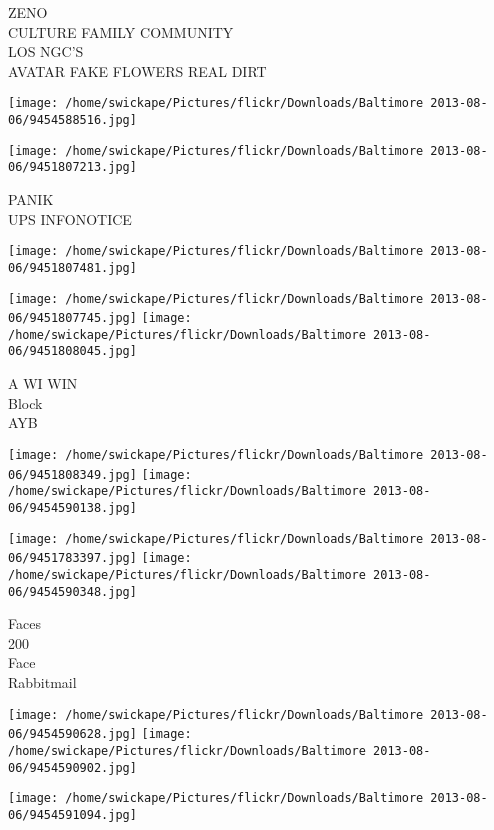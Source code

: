 \documentclass[10pt,letterpaper]{article}
\begin{document}
ZENO\\
CULTURE FAMILY COMMUNITY\\
LOS NGC'S\\
AVATAR FAKE FLOWERS REAL DIRT\\
\pagebreak

\texttt{[image: /home/swickape/Pictures/flickr/Downloads/Baltimore 2013-08-06/9454588516.jpg]}

\vspace{0.25in}
\texttt{[image: /home/swickape/Pictures/flickr/Downloads/Baltimore 2013-08-06/9451807213.jpg]}

PANIK\\
UPS INFONOTICE\\
\pagebreak

\texttt{[image: /home/swickape/Pictures/flickr/Downloads/Baltimore 2013-08-06/9451807481.jpg]}

\vspace{0.25in}
\texttt{[image: /home/swickape/Pictures/flickr/Downloads/Baltimore 2013-08-06/9451807745.jpg]}
\texttt{[image: /home/swickape/Pictures/flickr/Downloads/Baltimore 2013-08-06/9451808045.jpg]}

A WI WIN\\
Block\\
AYB\\
\pagebreak

\texttt{[image: /home/swickape/Pictures/flickr/Downloads/Baltimore 2013-08-06/9451808349.jpg]}
\texttt{[image: /home/swickape/Pictures/flickr/Downloads/Baltimore 2013-08-06/9454590138.jpg]}

\texttt{[image: /home/swickape/Pictures/flickr/Downloads/Baltimore 2013-08-06/9451783397.jpg]}
\texttt{[image: /home/swickape/Pictures/flickr/Downloads/Baltimore 2013-08-06/9454590348.jpg]}

Faces\\
200\\
Face\\
Rabbitmail\\
\pagebreak

\texttt{[image: /home/swickape/Pictures/flickr/Downloads/Baltimore 2013-08-06/9454590628.jpg]}
\texttt{[image: /home/swickape/Pictures/flickr/Downloads/Baltimore 2013-08-06/9454590902.jpg]}

\vspace{0.25in}
\texttt{[image: /home/swickape/Pictures/flickr/Downloads/Baltimore 2013-08-06/9454591094.jpg]}
\end{document}
